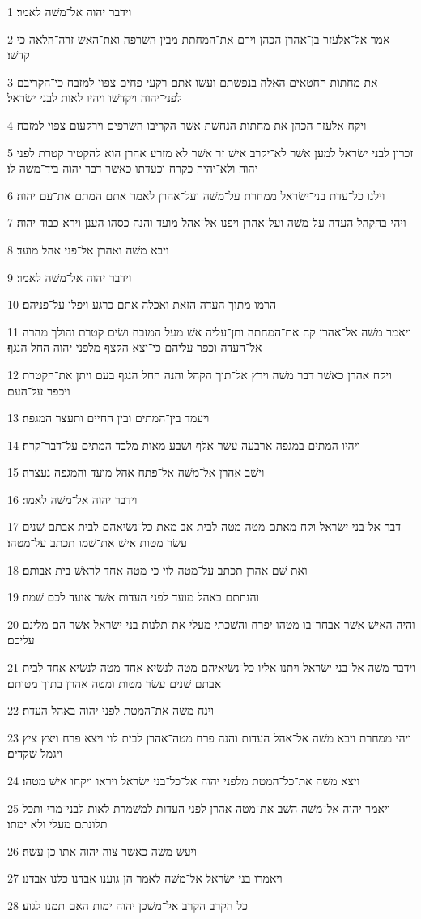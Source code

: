 \par 1 וידבר יהוה אל־משׁה לאמר׃
\par 2 אמר אל־אלעזר בן־אהרן הכהן וירם את־המחתת מבין השׂרפה ואת־האשׁ זרה־הלאה כי קדשׁו׃
\par 3 את מחתות החטאים האלה בנפשׁתם ועשׂו אתם רקעי פחים צפוי למזבח כי־הקריבם לפני־יהוה ויקדשׁו ויהיו לאות לבני ישׂראל׃
\par 4 ויקח אלעזר הכהן את מחתות הנחשׁת אשׁר הקריבו השׂרפים וירקעום צפוי למזבח׃
\par 5 זכרון לבני ישׂראל למען אשׁר לא־יקרב אישׁ זר אשׁר לא מזרע אהרן הוא להקטיר קטרת לפני יהוה ולא־יהיה כקרח וכעדתו כאשׁר דבר יהוה ביד־משׁה לו׃
\par 6 וילנו כל־עדת בני־ישׂראל ממחרת על־משׁה ועל־אהרן לאמר אתם המתם את־עם יהוה׃
\par 7 ויהי בהקהל העדה על־משׁה ועל־אהרן ויפנו אל־אהל מועד והנה כסהו הענן וירא כבוד יהוה׃
\par 8 ויבא משׁה ואהרן אל־פני אהל מועד׃
\par 9 וידבר יהוה אל־משׁה לאמר׃
\par 10 הרמו מתוך העדה הזאת ואכלה אתם כרגע ויפלו על־פניהם׃
\par 11 ויאמר משׁה אל־אהרן קח את־המחתה ותן־עליה אשׁ מעל המזבח ושׂים קטרת והולך מהרה אל־העדה וכפר עליהם כי־יצא הקצף מלפני יהוה החל הנגף׃
\par 12 ויקח אהרן כאשׁר דבר משׁה וירץ אל־תוך הקהל והנה החל הנגף בעם ויתן את־הקטרת ויכפר על־העם׃
\par 13 ויעמד בין־המתים ובין החיים ותעצר המגפה׃
\par 14 ויהיו המתים במגפה ארבעה עשׂר אלף ושׁבע מאות מלבד המתים על־דבר־קרח׃
\par 15 וישׁב אהרן אל־משׁה אל־פתח אהל מועד והמגפה נעצרה׃
\par 16 וידבר יהוה אל־משׁה לאמר׃
\par 17 דבר אל־בני ישׂראל וקח מאתם מטה מטה לבית אב מאת כל־נשׂיאהם לבית אבתם שׁנים עשׂר מטות אישׁ את־שׁמו תכתב על־מטהו׃
\par 18 ואת שׁם אהרן תכתב על־מטה לוי כי מטה אחד לראשׁ בית אבותם׃
\par 19 והנחתם באהל מועד לפני העדות אשׁר אועד לכם שׁמה׃
\par 20 והיה האישׁ אשׁר אבחר־בו מטהו יפרח והשׁכתי מעלי את־תלנות בני ישׂראל אשׁר הם מלינם עליכם׃
\par 21 וידבר משׁה אל־בני ישׂראל ויתנו אליו כל־נשׂיאיהם מטה לנשׂיא אחד מטה לנשׂיא אחד לבית אבתם שׁנים עשׂר מטות ומטה אהרן בתוך מטותם׃
\par 22 וינח משׁה את־המטת לפני יהוה באהל העדת׃
\par 23 ויהי ממחרת ויבא משׁה אל־אהל העדות והנה פרח מטה־אהרן לבית לוי ויצא פרח ויצץ ציץ ויגמל שׁקדים׃
\par 24 ויצא משׁה את־כל־המטת מלפני יהוה אל־כל־בני ישׂראל ויראו ויקחו אישׁ מטהו׃
\par 25 ויאמר יהוה אל־משׁה השׁב את־מטה אהרן לפני העדות למשׁמרת לאות לבני־מרי ותכל תלונתם מעלי ולא ימתו׃
\par 26 ויעשׂ משׁה כאשׁר צוה יהוה אתו כן עשׂה׃
\par 27 ויאמרו בני ישׂראל אל־משׁה לאמר הן גוענו אבדנו כלנו אבדנו׃
\par 28 כל הקרב הקרב אל־משׁכן יהוה ימות האם תמנו לגוע׃

